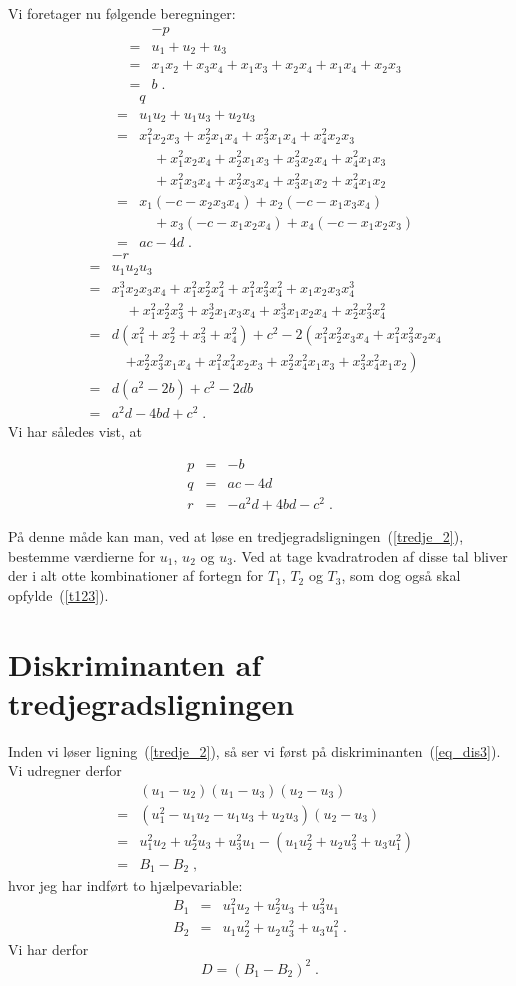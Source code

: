 \documentclass[12pt,oneside,a4paper]{article}
\newcommand{\bas}{\begin{eqnarray*}}
\newcommand{\eas}{\end{eqnarray*}}
\newcommand{\bea}{\begin{eqnarray}}
\newcommand{\eea}{\end{eqnarray}}
\begin{document}
Vi foretager nu følgende beregninger:
\bas
&& -p \\
&=& u_1+u_2+u_3 \\
&=& x_1x_2+x_3x_4 + x_1x_3+x_2x_4 + x_1x_4+x_2x_3 \\
&=& b\;.
\eas
\bas
&& q \\
&=& u_1u_2 + u_1u_3 + u_2u_3 \\
&=& x_1^2x_2x_3 + x_2^2x_1x_4 + x_3^2x_1x_4 + x_4^2x_2x_3 \\
&& \quad +x_1^2x_2x_4 + x_2^2x_1x_3 + x_3^2x_2x_4 + x_4^2x_1x_3 \\
&& \quad +x_1^2x_3x_4 + x_2^2x_3x_4 + x_3^2x_1x_2 + x_4^2x_1x_2 \\
&=& x_1(-c-x_2x_3x_4) + x_2(-c-x_1x_3x_4) \\
&& \quad + x_3(-c-x_1x_2x_4) + x_4(-c-x_1x_2x_3) \\
&=& ac-4d \;.
\eas
\bas
&& -r \\
&=& u_1u_2u_3 \\
&=& x_1^3x_2x_3x_4 + x_1^2x_2^2x_4^2 + x_1^2x_3^2x_4^2 + x_1x_2x_3x_4^3 \\
&& \quad + x_1^2x_2^2x_3^2 + x_2^3x_1x_3x_4 + x_3^3x_1x_2x_4 + x_2^2x_3^2x_4^2 \\
&=& d(x_1^2+x_2^2+x_3^2+x_4^2) + c^2 - 2\left(x_1^2x_2^2x_3x_4 + x_1^2x_3^2x_2x_4 \right.\\
&& \quad \left. + x_2^2x_3^2x_1x_4 + x_1^2x_4^2x_2x_3 + x_2^2x_4^2x_1x_3 + x_3^2x_4^2x_1x_2\right) \\
&=& d(a^2-2b) + c^2 - 2db \\
&=& a^2d - 4bd + c^2 \;.
\eas
Vi har således vist, at
\begin{tcolorbox}
\bea
p &=& -b \label{eq_p}\\
q &=& ac-4d \label{eq_q}\\
r &=& -a^2d+4bd-c^2 \label{eq_r}\;.
\eea
\end{tcolorbox}

På denne måde kan man, ved at løse en tredjegradsligningen~(\ref{tredje_2}),
bestemme værdierne for $u_1$, $u_2$ og $u_3$. Ved at tage kvadratroden af disse
tal bliver der i alt otte kombinationer af fortegn for $T_1$, $T_2$ og $T_3$,
som dog også skal opfylde~(\ref{t123}).

\section{Diskriminanten af tredjegradsligningen}
Inden vi løser ligning~(\ref{tredje_2}), så ser vi først på
diskriminanten~(\ref{eq_dis3}). Vi udregner derfor
\bas
&& (u_1-u_2)(u_1-u_3)(u_2-u_3) \\
&=& (u_1^2-u_1u_2-u_1u_3+u_2u_3)(u_2-u_3) \\
&=& u_1^2u_2+u_2^2u_3+u_3^2u_1 - (u_1u_2^2+u_2u_3^2+u_3u_1^2) \\
&=& B_1 - B_2  \;,
\eas
hvor jeg har indført to hjælpevariable:
\bas
B_1 &=& u_1^2u_2 + u_2^2u_3 + u_3^2u_1 \\
B_2 &=& u_1u_2^2 + u_2u_3^2 + u_3u_1^2 \;.
\eas
Vi har derfor
\begin{equation}
D = (B_1-B_2)^2 \;.
\end{equation}
\end{document}
